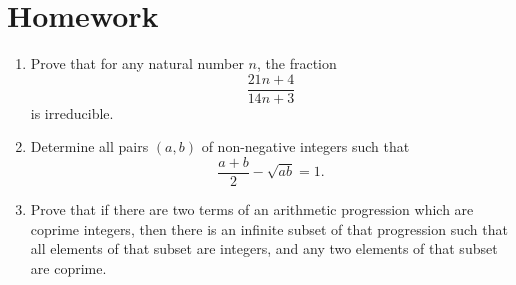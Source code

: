 \documentclass{article}
\begin{document}
\section{Homework}
\begin{enumerate}
	\item Prove that for any natural number $n$, the fraction
	      \[\frac{21n+4}{14n+3}\]
	      is irreducible.
	\item Determine all pairs $(a,b)$ of non-negative integers such that
	      \[\frac{a+b}2-\sqrt{ab}=1.\]
	\item Prove that if there are two terms of an arithmetic progression which are
	      coprime integers, then there is an infinite subset of that
	      progression such that all elements of that subset are integers, and
	      any two elements of that subset are coprime.
\end{enumerate}
\end{document}
